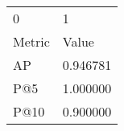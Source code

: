 \begin{tabular}{ll}
0 & 1 \\
Metric & Value \\
AP & 0.946781 \\
P@5 & 1.000000 \\
P@10 & 0.900000 \\
\end{tabular}
